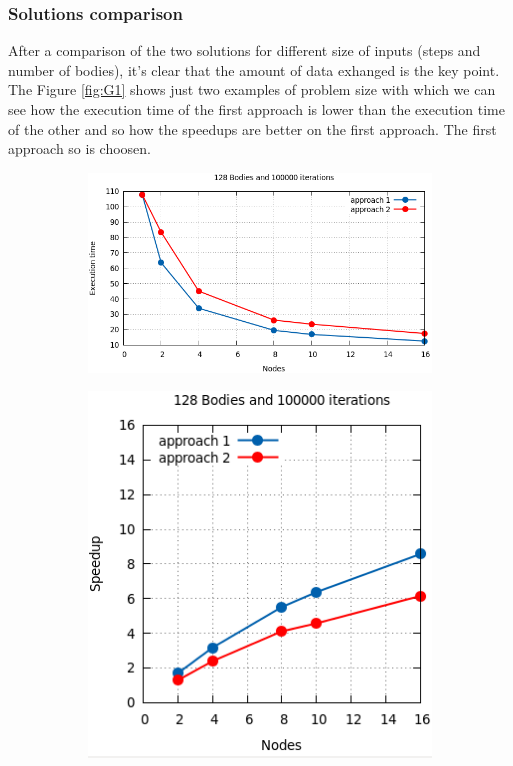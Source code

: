 \documentclass[a4paper]{article}
\begin{document}
\subsubsection{Solutions comparison}
\label{sec:sol_comp}
After a comparison of the two solutions for different size of inputs (steps and number of bodies), it's clear that the amount of data exhanged is the key point. The Figure \ref{fig:G1} shows just two examples of problem size with which we can see how the execution time of the first approach is lower than the execution time of the other and so how the speedups are better on the first approach. The first approach so is choosen.


\begin{figure}[ht]
\begin{subfigure}{.6\textwidth}
  \centering
  \includegraphics[width=1\linewidth]{results/graph1}
\end{subfigure} %
\begin{subfigure}{.4\textwidth}
  \centering
  \includegraphics[width=1\linewidth]{results/graph1_sp}

\end{subfigure}
\end{figure}
\end{document}
